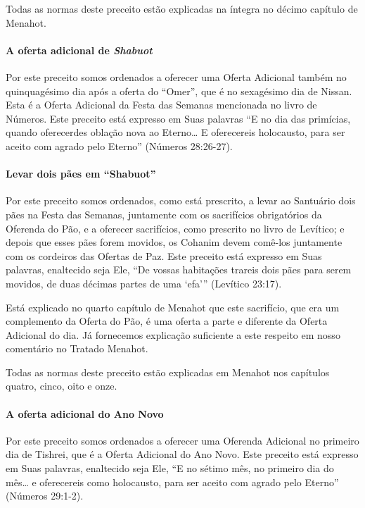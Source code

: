 Todas as normas deste preceito estão explicadas na íntegra no décimo
capítulo de Menahot.


\paragraph{A oferta adicional de \textit{Shabuot}}

Por este preceito somos ordenados a oferecer uma Oferta Adicional também
no quinquagésimo dia após a oferta do ``Omer'', que é no sexagésimo dia
de Nissan. Esta é a Oferta Adicional da Festa das Semanas mencionada no
livro de Números. Este preceito está expresso em Suas palavras ``E no
dia das primícias, quando oferecerdes oblação nova ao Eterno\ldots{} E
oferecereis holocausto, para ser aceito com agrado pelo Eterno''
(Números 28:26-27).

\paragraph{Levar dois pães em ``Shabuot''}

Por este preceito somos ordenados, como está prescrito, a levar ao
Santuário dois pães na Festa das Semanas, juntamente com os sacrifícios
obrigatórios da Oferenda do Pão, e a oferecer sacrifícios, como
prescrito no livro de Levítico; e depois que esses pães forem movidos,
os Cohanim devem comê-los juntamente com os cordeiros das Ofertas de
Paz. Este preceito está expresso em Suas palavras, enaltecido seja Ele,
``De vossas habitações trareis dois pães para serem movidos, de duas
décimas partes de uma `efa''' (Levítico 23:17).

Está explicado no quarto capítulo de Menahot que este sacrifício, que
era um complemento da Oferta do Pão, é uma oferta a parte e diferente da
Oferta Adicional do dia. Já fornecemos explicação suficiente a este
respeito em nosso comentário no Tratado Menahot.

Todas as normas deste preceito estão explicadas em Menahot nos capítulos
quatro, cinco, oito e onze.

\paragraph{A oferta adicional do Ano Novo}

Por este preceito somos ordenados a oferecer uma Oferenda Adicional no
primeiro dia de Tishrei, que é a Oferta Adicional do Ano Novo. Este
preceito está expresso em Suas palavras, enaltecido seja Ele, ``E no
sétimo mês, no primeiro dia do mês\ldots{} e oferecereis como holocausto,
para ser aceito com agrado pelo Eterno'' (Números 29:1-2).

